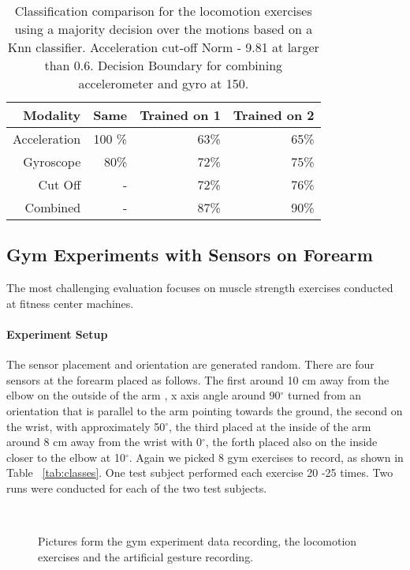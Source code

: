 \begin{table}
\centering
\caption[Classification comparison]{Classification comparison for the locomotion exercises using a
majority decision over the motions based on a Knn
classifier. Acceleration cut-off Norm - 9.81 at larger than
0.6. Decision Boundary for combining accelerometer and gyro at 150.}
\begin{tabular}%
{rrrr}\toprule
Modality& Same& Trained on 1& Trained on 2\\\midrule
Acceleration& 100 \%& 63\%&	 65\%\\
Gyroscope&      80\% &72\%& 75\%\\
Cut Off& -& 72\%&  76\%\\
Combined & -& 87\%& 90\%\\
\bottomrule
\end{tabular}%
\label{tab:results_loco}
\end{table}

\subsection{Gym Experiments with Sensors on Forearm}

The most challenging evaluation focuses on muscle 
strength exercises conducted at fitness center
machines. 
\paragraph{Experiment Setup} 
 The sensor placement
and orientation are generated  random. There are
 four sensors at the forearm placed as follows. The first around 10 cm away from the elbow on the outside of the arm , x axis angle around 90$^{\circ}$ turned from an orientation that is parallel to the arm pointing towards the ground, the second on the wrist, with approximately 50$^{\circ}$, the third placed at the inside of the arm around 8 cm away from the wrist with 0$^{\circ}$, the forth placed also on the inside closer to the elbow at 10$^{\circ}$.
Again we picked 8 gym exercises to record, as shown in Table ~\ref{tab:classes}. 
One test subject performed each exercise 20 -25 times. Two runs were conducted for each of the two test subjects. 
\begin{figure}[t]
    \begin{center}
	\\
      \end{center}
\caption[Experimental setup pictures]{
Pictures form the gym experiment data recording, the locomotion exercises 
and the artificial gesture recording.}
\label{fig:experimentalsetup}
\end{figure}

